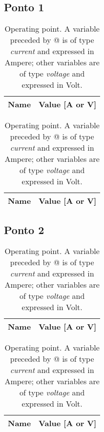 \subsection{Ponto 1}

\begin{table}[h]
  \centering
  \begin{tabular}{|l|r|}
    \hline    
    {\bf Name} & {\bf Value [A or V]} \\ \hline
    
  \end{tabular}
  \caption{Operating point. A variable preceded by @ is of type {\em current}
    and expressed in Ampere; other variables are of type {\it voltage} and expressed in
    Volt.}
  \label{tab:mat1}
\end{table}


\begin{table}[h]
  \centering
  \begin{tabular}{|l|r|}
    \hline    
    {\bf Name} & {\bf Value [A or V]} \\ \hline
    
  \end{tabular}
  \caption{Operating point. A variable preceded by @ is of type {\em current}
    and expressed in Ampere; other variables are of type {\it voltage} and expressed in
    Volt.}
  \label{tab:mat1a}
\end{table}



\subsection{Ponto 2}

\begin{table}[h]
  \centering
  \begin{tabular}{|l|r|}
    \hline    
    {\bf Name} & {\bf Value [A or V]} \\ \hline
    
  \end{tabular}
  \caption{Operating point. A variable preceded by @ is of type {\em current}
    and expressed in Ampere; other variables are of type {\it voltage} and expressed in
    Volt.}
  \label{tab:mat2}
\end{table}

\begin{table}[h]
  \centering
  \begin{tabular}{|l|r|}
    \hline    
    {\bf Name} & {\bf Value [A or V]} \\ \hline
    
  \end{tabular}
  \caption{Operating point. A variable preceded by @ is of type {\em current}
    and expressed in Ampere; other variables are of type {\it voltage} and expressed in
    Volt.}
  \label{tab:mat2a}
\end{table}

